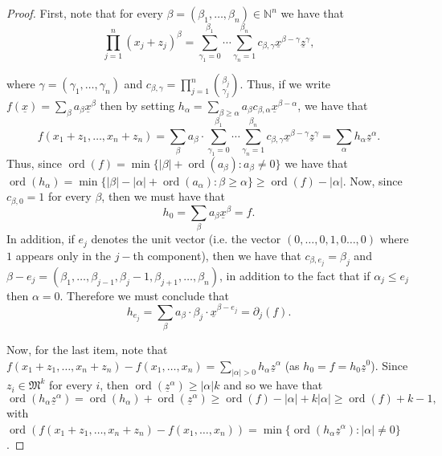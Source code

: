 \documentclass{article}
\DeclareMathOperator{\ord}{ord}
\numberwithin{theorem}{section}
\begin{document}
\begin{proof}
First, note that for every $\beta=(\beta_1, \dots, \beta_n) \in \mathbb{N}^n$ we have that 
\begin{equation*}
    \prod_{j=1}^n (x_j+z_j)^\beta =\sum_{\gamma_1=0}^{\beta_1} \cdots \sum_{\gamma_n=1}^{\beta_n} c_{\beta, \gamma}\underline{x}^{\beta-\gamma} \underline{z}^\gamma,
\end{equation*}

\noindent where $\gamma=(\gamma_1, \dots, \gamma_n)$ and $c_{\beta, \gamma} = \prod_{j=1}^n \binom{\beta_j}{\gamma_j}$. Thus, if we write $f(\underline{x})=\sum_{\beta} a_\beta \underline{x}^\beta$ then by setting $h_\alpha=\sum_{ \beta\geq \alpha} a_\beta c_{\beta, \alpha} \underline{x}^{\beta-\alpha}$, we have that 
%
\begin{equation*}
f(x_1+z_1, \dots, x_n+z_n) =     \sum_{\beta} a_\beta \cdot \sum_{\gamma_1=0}^{\beta_1} \cdots \sum_{\gamma_n=1}^{\beta_n} c_{\beta, \gamma}\underline{x}^{\beta-\gamma} \underline{z}^\gamma =\sum_\alpha h_\alpha \underline{z}^\alpha.  
\end{equation*}
%
\noindent Thus, since $\ord(f)=\min\{ |\beta| + \ord(a_\beta) \colon a_\beta \neq 0\}$ we have that $\ord(h_\alpha) = \min \{|\beta|-|\alpha| +\ord(a_\alpha) \colon \beta \geq \alpha\}\geq \ord(f)-|\alpha|$. Now, since $c_{\beta, 0}=1$ for every $\beta$, then we must have that 
%
\begin{equation*}
    h_0=\sum_{\beta} a_\beta  \underline{x}^{\beta} =f. 
\end{equation*}
%
\noindent In addition, if $e_j$ denotes the unit vector (i.e. the vector $(0, \dots, 0,1,0 \dots, 0)$ where $1$ appears only in the $j-$th component), then we have that $c_{\beta, e_j} = \beta_j$ and $\beta-e_j = (\beta_1, \dots, \beta_{j-1}, \beta_j -1, \beta_{j+1}, \dots, \beta_n)$, in addition to the fact that if $\alpha_j \leq e_j$ then $\alpha=0$. Therefore we must conclude that
%
\begin{equation*}
    h_{e_j} = \sum_{\beta} a_\beta \cdot \beta_j \cdot   \underline{x}^{\beta - e_j} = \partial_j(f).
\end{equation*}
%

Now, for the last item, note that $f(x_1+z_1, \dots, x_n+z_n)-f(x_1, \dots, x_n) = \sum_{|\alpha|>0} h_\alpha \underline{z}^\alpha$ (as $h_0=f=h_0 \underline{z}^0$). Since $z_i \in \mathfrak{M}^k$ for every $i$, then $\ord(\underline{z}^\alpha) \geq |\alpha|k$ and so we have that 
\begin{equation*}
    \ord(h_\alpha \underline{z}^\alpha) = \ord(h_\alpha) + \ord(\underline{z}^\alpha) \geq \ord(f) -|\alpha|+k|\alpha| \geq \ord(f)+k-1,
\end{equation*}
with $\ord(f(x_1+z_1, \dots, x_n+z_n)-f(x_1, \dots, x_n)) = \min\{ \ord(h_\alpha \underline{z}^\alpha) \colon |\alpha| \neq 0\}$. 
\end{proof}
\end{document}

